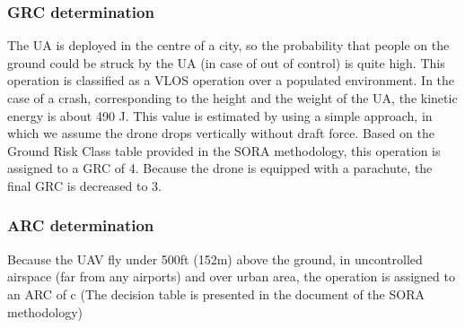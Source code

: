 \documentclass[a4paper, 10, conference]{ieeeconf}  %
\begin{document}
\subsubsection{GRC determination}

The UA is deployed in the centre of a city, so the probability that people on the ground could be struck by the UA (in case of out of control) is quite high. This operation is classified as a VLOS operation over a populated environment. In the case of a crash, corresponding to the height and the weight of the UA, the kinetic energy is about 490 J. This value is estimated by using a simple approach, in which we assume the drone drops vertically without draft force. Based on the Ground Risk Class table provided in the SORA methodology, this operation is assigned to a GRC of 4. Because the drone is equipped with a parachute, the final GRC is decreased to 3.

\subsubsection{ARC determination}

Because the UAV fly under 500ft (152m) above the ground, in uncontrolled airspace (far from any airports) and over urban area, the operation is assigned to an ARC of c (The decision table is presented in the document of  the SORA methodology\cite{SORAV2})
\end{document}
